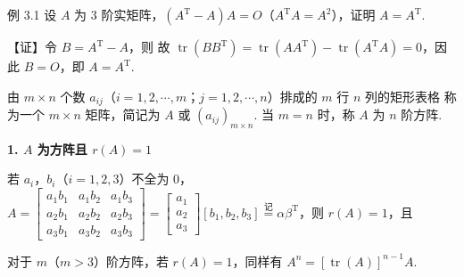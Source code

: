 
\begin{fcard}{例 3.1}
设 $A$ 为 3 阶实矩阵，$(A^{\mathrm T}-A)A=O$（$A^{\mathrm T}A=A^2$），证明 $A=A^{\mathrm T}$.
\end{fcard}

【证】令 $B=A^{\mathrm T}-A$，则
故 $\operatorname{tr}(BB^{\mathrm T})=\operatorname{tr}(AA^{\mathrm T})-\operatorname{tr}(A^{\mathrm T}A)=0$，因此 $B=O$，即 $A=A^{\mathrm T}$.


由 $m\times n$ 个数 $a_{ij}$（$i=1,2,\cdots,m$；$j=1,2,\cdots,n$）排成的 $m$ 行 $n$ 列的矩形表格
称为一个 $m\times n$ 矩阵，简记为 $A$ 或 $(a_{ij})_{m\times n}$. 当 $m=n$ 时，称 $A$ 为 $n$ 阶方阵.

\textbf{1. $A$ 为方阵且 $r(A)=1$}

若 $a_i$，$b_i$（$i=1,2,3$）不全为 0，$A=\begin{bmatrix}a_1b_1&a_1b_2&a_1b_3\\a_2b_1&a_2b_2&a_2b_3\\a_3b_1&a_3b_2&a_3b_3\end{bmatrix}=\begin{bmatrix}a_1\\a_2\\a_3\end{bmatrix}[b_1,b_2,b_3]\overset{\text{记}}{=}\alpha\beta^{\mathrm T}$，则 $r(A)=1$，且

对于 $m$（$m>3$）阶方阵，若 $r(A)=1$，同样有 $A^n=[\operatorname{tr}(A)]^{n-1}A$.

